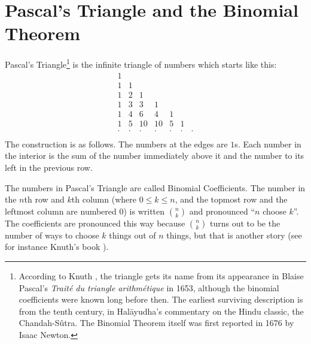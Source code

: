 
\setlength{\unitlength}{1mm}

\def\obj#1{\mbox{\tt#1}}

%

\section{Pascal's Triangle and the Binomial Theorem}

Pascal's Triangle\footnote{
According to Knuth \cite{knuth73}, the triangle gets its name from
its appearance in Blaise Pascal's {\em Trait\'e du triangle arithm\'etique}
in 1653, although the binomial coefficients were known long before then.
The earliest surviving description is from the tenth century,
in Hal\={a}yudha's commentary on the Hindu classic, the Chandah-S\^{u}tra.
The Binomial Theorem itself was first reported in 1676 by Isaac Newton.
}
is the infinite triangle of numbers which starts like this:
\[\begin{array}{ccccccc}
1  \\
1 & 1 \\
1 & 2 & 1 \\
1 & 3 & 3 & 1 \\
1 & 4 & 6 & 4 & 1 \\
1 & 5 & 10 & 10 & 5 & 1 \\
\cdot & \cdot & \cdot & \cdot & \cdot & \cdot & \cdot \\
\end{array}\]
The construction is as follows. The numbers at the edges
are $1$s. Each number in the interior is the sum of the number immediately
above it and the number to its left in the previous row.

The numbers in Pascal's Triangle are called Binomial Coefficients.
The number in the $n$th row and $k$th column (where $0 \leq k \leq n$, and the
topmost row and the leftmost column are numbered $0$) is written
$n \choose k$ and pronounced ``$n$ choose $k$''.  The coefficients are
pronounced this way because $n \choose k$ turns out to be the number of
ways to choose $k$ things out of $n$ things, but that is another story
(see for instance Knuth's book \cite{knuth73}).

